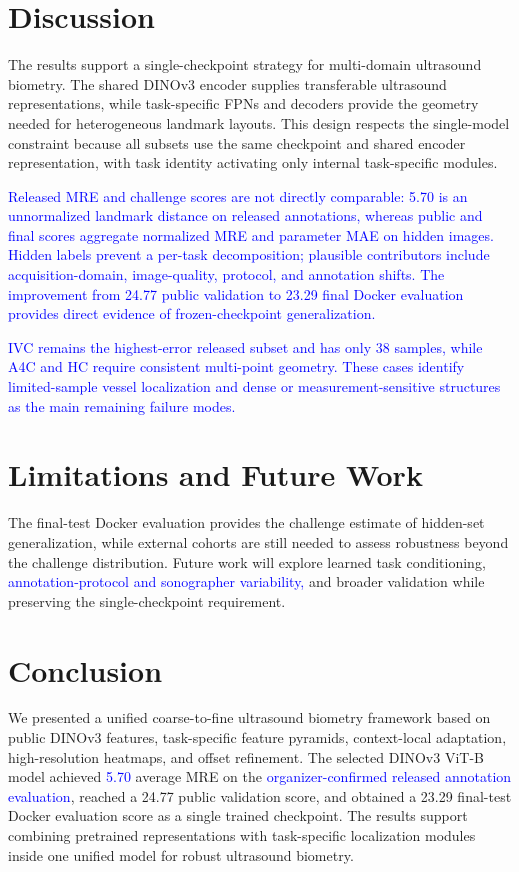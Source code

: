\documentclass[runningheads]{llncs}
\newcommand{\revisiontext}[1]{\textcolor{blue}{#1}}
\begin{document}
\section{Discussion}
The results support a single-checkpoint strategy for multi-domain ultrasound biometry. The shared DINOv3 encoder supplies transferable ultrasound representations, while task-specific FPNs and decoders provide the geometry needed for heterogeneous landmark layouts. This design respects the single-model constraint because all subsets use the same checkpoint and shared encoder representation, with task identity activating only internal task-specific modules.

\revisiontext{Released MRE and challenge scores are not directly comparable: 5.70 is an unnormalized landmark distance on released annotations, whereas public and final scores aggregate normalized MRE and parameter MAE on hidden images. Hidden labels prevent a per-task decomposition; plausible contributors include acquisition-domain, image-quality, protocol, and annotation shifts. The improvement from 24.77 public validation to 23.29 final Docker evaluation provides direct evidence of frozen-checkpoint generalization.}

\revisiontext{IVC remains the highest-error released subset and has only 38 samples, while A4C and HC require consistent multi-point geometry. These cases identify limited-sample vessel localization and dense or measurement-sensitive structures as the main remaining failure modes.}

\section{Limitations and Future Work}
The final-test Docker evaluation provides the challenge estimate of hidden-set generalization, while external cohorts are still needed to assess robustness beyond the challenge distribution. Future work will explore learned task conditioning, \revisiontext{annotation-protocol and sonographer variability,} and broader validation while preserving the single-checkpoint requirement.

\section{Conclusion}
We presented a unified coarse-to-fine ultrasound biometry framework based on public DINOv3 features, task-specific feature pyramids, context-local adaptation, high-resolution heatmaps, and offset refinement. The selected DINOv3 ViT-B model achieved \revisiontext{5.70} average MRE on the \revisiontext{organizer-confirmed released annotation evaluation}, reached a 24.77 public validation score, and obtained a 23.29 final-test Docker evaluation score as a single trained checkpoint. The results support combining pretrained representations with task-specific localization modules inside one unified model for robust ultrasound biometry.
\end{document}
